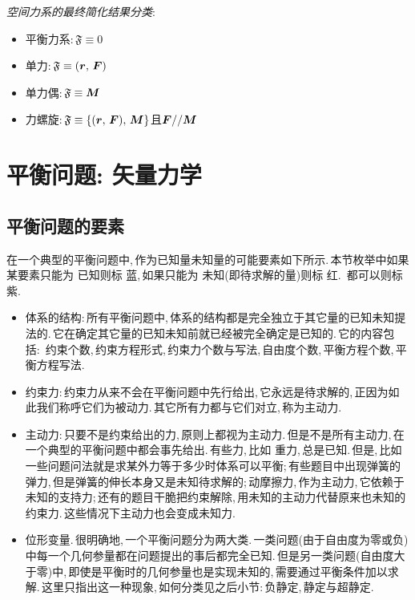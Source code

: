 \vspace{0.5cm}

\emph{空间力系的最终简化结果分类}:
\begin{itemize}
	\item 平衡力系:\,$\mathfrak{F}\equiv\mathfrak{0}$
	\item 单力:\,$\mathfrak{F}\equiv(\boldsymbol{r},\,\boldsymbol{F})$
	\item 单力偶:\,$\mathfrak{F}\equiv\boldsymbol{M}$
	\item 力螺旋:\,$\mathfrak{F}\equiv\{(\boldsymbol{r},\,\boldsymbol{F}),\,\boldsymbol{M}\}$且$\boldsymbol{F}//\boldsymbol{M}$
\end{itemize}



\section{平衡问题:  矢量力学}

\subsection{平衡问题的要素}

在一个典型的平衡问题中,\,作为已知量未知量的可能要素如下所示.\,本节枚举中如果某要素只能为{\color{blue} 已知}则标{\color{blue} 蓝},\,如果只能为{\color{red} 未知}(即待求解的量)则标{\color{red} 红}.\,{\color{purple} 都可以}则标{\color{purple} 紫}.

\begin{itemize}
	\item {\color{blue} 体系的结构}:\,所有平衡问题中,\,体系的结构都是完全独立于其它量的已知未知提法的.\,它在确定其它量的已知未知前就已经被完全确定是已知的.\,它的内容包括:\,{\color{blue} 约束个数,\,约束方程形式,\,约束力个数与写法,\,自由度个数,\,平衡方程个数,\,平衡方程写法}.
	\item {\color{red} 约束力}:\,约束力从来不会在平衡问题中先行给出,\,它永远是待求解的,\,正因为如此我们称呼它们为被动力.\,其它所有力都与它们对立,\,称为主动力.
	\item {\color{purple} 主动力}:\,只要不是约束给出的力,\,原则上都视为主动力.\,但是不是所有主动力,\,在一个典型的平衡问题中都会事先给出.\,有些力,\,比如{\color{blue} 重力},\,总是已知.\,但是,\,比如一些问题问法就是求某外力等于多少时体系可以平衡;\,有些题目中出现弹簧的弹力,\,但是弹簧的伸长本身又是未知待求解的;\,动摩擦力,\,作为主动力,\,它依赖于未知的支持力;\,还有的题目干脆把约束解除,\,用未知的主动力代替原来也未知的约束力.\,这些情况下主动力也会变成未知力.
	\item {\color{purple} 位形变量}.\,很明确地,\,一个平衡问题分为两大类.\,一类问题(由于自由度为零或负)中每一个几何参量都在问题提出的事后都完全已知.\,但是另一类问题(自由度大于零)中,\,即使是平衡时的几何参量也是实现未知的,\,需要通过平衡条件加以求解.\,这里只指出这一种现象,\,如何分类见之后小节:\,负静定,\,静定与超静定.
\end{itemize}

